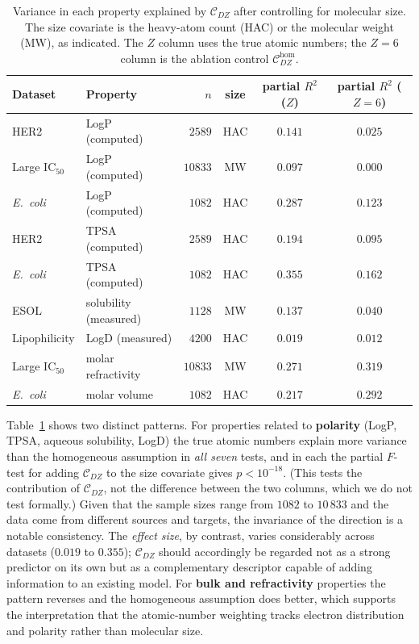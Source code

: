 \documentclass[11pt,a4paper]{article}
\theoremstyle{plain}
\theoremstyle{definition}
\theoremstyle{remark}
\newcommand{\CDZ}{\mathcal{C}_{DZ}}
\newcommand{\CDZhom}{\mathcal{C}_{DZ}^{\mathrm{hom}}}
\begin{document}
\begin{table}[htbp]
\centering
\small
\caption{Variance in each property explained by $\CDZ$ after controlling for
molecular size. The size covariate is the heavy-atom count (HAC) or the
molecular weight (MW), as indicated. The $Z$ column uses the true atomic
numbers; the $Z{=}6$ column is the ablation control $\CDZhom$.}
\label{tab:hetero}
\begin{tabular}{llrccc}
\toprule
Dataset & Property & $n$ & size & partial $R^2$ ($Z$) & partial $R^2$ ($Z{=}6$) \\
\midrule
HER2             & LogP (computed)        & $2589$  & HAC & $0.141$ & $0.025$ \\
Large IC$_{50}$  & LogP (computed)        & $10833$ & MW  & $0.097$ & $0.000$ \\
\textit{E.~coli} & LogP (computed)        & $1082$  & HAC & $0.287$ & $0.123$ \\
HER2             & TPSA (computed)        & $2589$  & HAC & $0.194$ & $0.095$ \\
\textit{E.~coli} & TPSA (computed)        & $1082$  & HAC & $0.355$ & $0.162$ \\
ESOL             & solubility (measured)  & $1128$  & MW  & $0.137$ & $0.040$ \\
Lipophilicity    & LogD (measured)        & $4200$  & HAC & $0.019$ & $0.012$ \\
\midrule
Large IC$_{50}$  & molar refractivity     & $10833$ & MW  & $0.271$ & $\mathbf{0.319}$ \\
\textit{E.~coli} & molar volume           & $1082$  & HAC & $0.217$ & $\mathbf{0.292}$ \\
\bottomrule
\end{tabular}
\end{table}

Table~\ref{tab:hetero} shows two distinct patterns. For properties related to
\textbf{polarity} (LogP, TPSA, aqueous solubility, LogD) the true atomic numbers
explain more variance than the homogeneous assumption in \emph{all seven} tests,
and in each the partial $F$-test for adding $\CDZ$ to the size covariate gives
$p<10^{-18}$. (This tests the contribution of $\CDZ$, not the difference between
the two columns, which we do not test formally.) Given that the sample sizes
range from $1082$ to $10\,833$ and the data come from different sources and
targets, the invariance of the direction is a notable consistency. The
\emph{effect size}, by contrast, varies considerably across datasets
($0.019$ to $0.355$); $\CDZ$ should accordingly be regarded not as a strong
predictor on its own but as a complementary descriptor capable of adding
information to an existing model. For \textbf{bulk and refractivity} properties
the pattern reverses and the homogeneous assumption does better, which supports
the interpretation that the atomic-number weighting tracks electron distribution
and polarity rather than molecular size.
\end{document}

